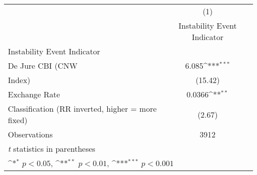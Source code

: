 {
\def\sym#1{\ifmmode^{#1}\else\(^{#1}\)\fi}
\begin{tabular}{l*{1}{c}}
\toprule
                &\multicolumn{1}{c}{(1)}\\
                &\multicolumn{1}{c}{Instability Event Indicator}\\
\midrule
Instability Event Indicator&                  \\
De Jure CBI (CNW&    6.085\sym{***}\\
Index)          &  (15.42)         \\
\addlinespace
Exchange Rate   &   0.0366\sym{**} \\
Classification (RR inverted, higher = more fixed)&   (2.67)         \\
\midrule
Observations    &     3912         \\
\bottomrule
\multicolumn{2}{l}{\footnotesize \textit{t} statistics in parentheses}\\
\multicolumn{2}{l}{\footnotesize \sym{*} \(p<0.05\), \sym{**} \(p<0.01\), \sym{***} \(p<0.001\)}\\
\end{tabular}
}
